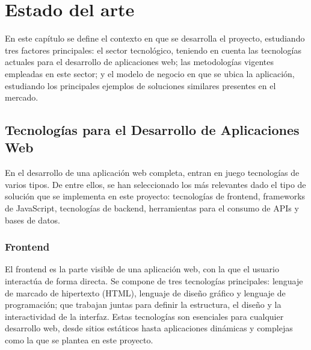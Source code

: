 ﻿\chapter{Estado del arte}

En este capítulo se define el contexto en que se desarrolla el proyecto, estudiando tres factores principales: el sector tecnológico, teniendo en cuenta las tecnologías actuales para el desarrollo de aplicaciones web; las metodologías vigentes empleadas en este sector; y el modelo de negocio en que se ubica la aplicación, estudiando los principales ejemplos de soluciones similares presentes en el mercado.

\section{Tecnologías para el Desarrollo de Aplicaciones Web}
En el desarrollo de una aplicación web completa, entran en juego tecnologías de varios tipos. De entre ellos, se han seleccionado los más relevantes dado el tipo de solución que se implementa en este proyecto: tecnologías de frontend, frameworks de JavaScript, tecnologías de backend, herramientas para el consumo de APIs y bases de datos.

\subsection{Frontend}
El frontend es la parte visible de una aplicación web, con la que el usuario interactúa de forma directa. Se compone de tres tecnologías principales: lenguaje de marcado de hipertexto (HTML), lenguaje de diseño gráfico y lenguaje de programación; que trabajan juntas para definir la estructura, el diseño y la interactividad de la interfaz. Estas tecnologías son esenciales para cualquier desarrollo web, desde sitios estáticos hasta aplicaciones dinámicas y complejas como la que se plantea en este proyecto.

